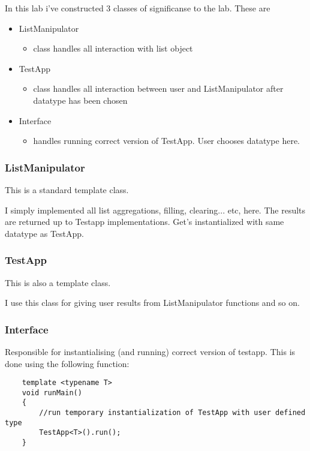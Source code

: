 \documentclass[11pt]{article}
\begin{document}
In this lab i've constructed 3 classes of significanse to the lab. These are
\begin{itemize}
	\item ListManipulator
	\begin{itemize}
		\item class handles all interaction with list object
	\end{itemize}
	\item TestApp
	\begin{itemize}
		\item class handles all interaction between user and ListManipulator after datatype has been chosen
	\end{itemize}
	\item Interface
	\begin{itemize}
		\item handles running correct version of TestApp. User chooses datatype here.
	\end{itemize}
\end{itemize}

\subsubsection{ListManipulator}
This is a standard template class.

I simply implemented all list aggregations, filling, clearing... etc, here. The results are returned up to Testapp implementations.
Get's instantialized with same datatype as TestApp.

\subsubsection{TestApp}
This is also a template class.

I use this class for giving user results from ListManipulator functions and so on.

\subsubsection{Interface}
Responsible for instantialising (and running) correct version of testapp. This is done using the following function:
\newpage

\begin{lstlisting}
	template <typename T>
	void runMain()
	{
		//run temporary instantialization of TestApp with user defined type 
		TestApp<T>().run(); 
	}	
\end{lstlisting}
\end{document}
